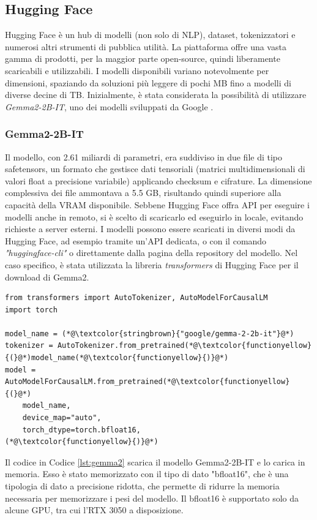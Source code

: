 \subsection{Hugging Face}
Hugging Face è un hub di modelli (non solo di NLP), dataset, tokenizzatori e numerosi altri strumenti di pubblica utilità. La piattaforma offre una vasta gamma di prodotti, per la maggior parte open-source, quindi liberamente scaricabili e utilizzabili. I modelli disponibili variano notevolmente per dimensioni, spaziando da soluzioni più leggere di pochi MB fino a modelli di diverse decine di TB. Inizialmente, è stata considerata la possibilità di utilizzare \textit{Gemma2-2B-IT}, uno dei modelli sviluppati da Google \cite{gemma22bit}.

\subsubsection{Gemma2-2B-IT}
Il modello, con 2.61 miliardi di parametri, era suddiviso in due file di tipo safetensors, un formato che gestisce dati tensoriali (matrici multidimensionali di valori float a precisione variabile) applicando checksum e cifrature. La dimensione complessiva dei file ammontava a 5.5 GB, risultando quindi superiore alla capacità della VRAM disponibile. Sebbene Hugging Face offra API per eseguire i modelli anche in remoto, si è scelto di scaricarlo ed eseguirlo in locale, evitando richieste a server esterni. I modelli possono essere scaricati in diversi modi da Hugging Face, ad esempio tramite un'API dedicata, o con il comando \textit{"huggingface-cli"} o direttamente dalla pagina della repository del modello. Nel caso specifico, è stata utilizzata la libreria \textit{transformers} di Hugging Face per il download di Gemma2.
\begin{lstlisting}[label=lst:gemma2, caption={Installazione di Gemma2}]
from transformers import AutoTokenizer, AutoModelForCausalLM
import torch

model_name = (*@\textcolor{stringbrown}{"google/gemma-2-2b-it"}@*)
tokenizer = AutoTokenizer.from_pretrained(*@\textcolor{functionyellow}{(}@*)model_name(*@\textcolor{functionyellow}{)}@*)
model = AutoModelForCausalLM.from_pretrained(*@\textcolor{functionyellow}{(}@*)
    model_name,
    device_map="auto",
    torch_dtype=torch.bfloat16,
(*@\textcolor{functionyellow}{)}@*)
\end{lstlisting}
Il codice in Codice \ref{lst:gemma2} scarica il modello Gemma2-2B-IT e lo carica in memoria. Esso è stato memorizzato con il tipo di dato "bfloat16", che è una tipologia di dato a precisione ridotta, che permette di ridurre la memoria necessaria per memorizzare i pesi del modello. Il bfloat16 è supportato solo da alcune GPU, tra cui l'RTX 3050 a disposizione.

